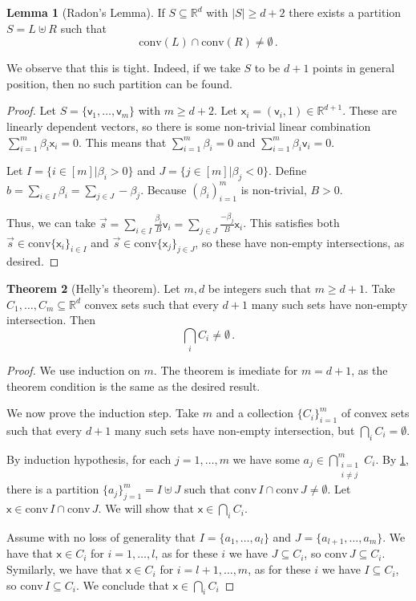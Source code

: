 \documentclass[12pt]{amsart}
\theoremstyle{definition}
\newtheorem{thm}{Theorem}[section]
\newtheorem{lm}[thm]{Lemma}
\newcommand{\R}{\mathbb{R}}
\newcommand{\vv}{\mathsf{v}}
\newcommand{\vx}{\mathsf{x}}
\newcommand{\conv}{\mathrm{conv}}
\begin{document}
\begin{lm}[Radon's Lemma]\label{lm:radon}
If $S\subseteq \R^d$ with $|S| \geq d+2$ there exists a partition $S = L \uplus R$ such that $$\conv (L) \cap \conv (R) \neq \emptyset \, .$$
\end{lm}

We observe that this is tight.
Indeed, if we take $S$ to be $d+1$ points in general position, then no such partition can be found.

\begin{proof}
Let $S = \{\vv_1, \ldots, \vv_m \}$ with $m\geq d+2$.
Let $\vx_i = (\vv_i, 1)\in \R^{d+1}$.
These are linearly dependent vectors, so there is some non-trivial linear combination $\sum_{i=1}^m \beta_i \vx_i = 0$.
This means that $\sum_{i=1}^m \beta_i = 0$ and $\sum_{i=1}^m \beta_i \vv_i = 0$.

Let $I = \{i\in [m] | \beta_i  > 0 \}$ and $J = \{j\in [m] | \beta_j < 0 \}$.
Define $b = \sum_{i\in I} \beta_i = \sum_{j\in J} - \beta_j$.
Because $(\beta_i)_{i=1}^m$ is non-trivial, $B>0$.

Thus, we can take $\vec{s} = \sum_{i\in I} \frac{\beta_i}{B} \vv_i = \sum_{j\in J}\frac{-\beta_j}{B}\vx_i$.
This satisfies both $\vec{s} \in \conv \{\vx_i\}_{i\in I}$ and $\vec{s} \in \conv \{\vx_j\}_{j\in J}$, so these have non-empty intersections, as desired.
\end{proof}


\begin{thm}[Helly's theorem]\label{thm:helly}
Let $m, d $ be integers such that $m \geq d+1$.
Take $C_1, \ldots , C_m \subseteq \R^d$ convex sets such that every $d+1$ many such sets have non-empty intersection.
Then 
$$\bigcap_i C_i \neq \emptyset \, . $$
\end{thm}

\begin{proof}
We use induction on $m$.
The theorem is imediate for $m = d+1$, as the theorem condition is the same as the desired result.

We now prove the induction step.
Take $m$ and a collection $\{C_i\}_{i=1}^m$ of convex sets such that every $d+1$ many such sets have non-empty intersection, but $\bigcap_i C_i = \emptyset$.

By induction hypothesis, for each $j = 1, \ldots, m$ we have some $a_j \in \bigcap_{\substack{i=1 \\ i\neq j}}^m C_i$.
By \cref{lm:radon}, there is a partition $\{a_j\}_{j=1}^m = I \uplus J$ such that $\conv \, I \cap \conv \, J \neq \emptyset$.
Let $\vx \in \conv \, I \cap \conv \, J $.
We will show that $\vx \in \bigcap_i C_i$.

Assume with no loss of generality that $I = \{a_1, \ldots, a_l\} $ and $J= \{ a_{l+1} , \ldots, a_m\}$.
We have that $\vx \in C_i$ for $i = 1, \ldots, l$, as for these $i$ we have $J \subseteq  C_i$, so $\conv \, J \subseteq C_i$.
Symilarly, we have that $\vx \in C_i$ for $i = l+1, \ldots, m$, as for these $i$ we have $I \subseteq  C_i$, so $\conv \, I \subseteq C_i$.
We conclude that $\vx \in \bigcap_i C_i$
\end{proof}
\end{document}
